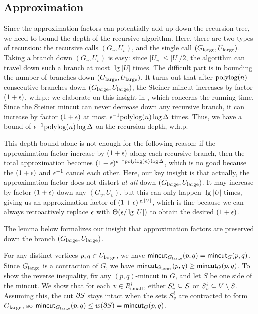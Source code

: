 
\subsection{Approximation}

Since the approximation factors can potentially add up down the recursion tree, we need to bound the depth of the recursive algorithm. Here, there are two types of recursion: the recursive calls $(G_v,U_v)$, and the single call $(G_{\textup{large}},U_{\textup{large}})$.  Taking a branch down $(G_v,U_v)$ is easy: since $|U_v|\le|U|/2$, the algorithm can travel down such a branch at most $\lg|U|$ times. The difficult part is in bounding the number of branches down $(G_{\textup{large}},U_{\textup{large}})$. It turns out that after $\textup{polylog}(n)$ consecutive branches down $(G_{\textup{large}},U_{\textup{large}})$, the Steiner mincut increases by factor $(1+\epsilon)$, w.h.p.; we elaborate on this insight in , which concerns the running time. Since the Steiner mincut can never decrease down any recursive branch, it can increase by factor $(1+\epsilon)$ at most $\epsilon^{-1}\textup{polylog}(n)\log\Delta$ times. Thus, we have a bound of $\epsilon^{-1}\textup{polylog}(n)\log\Delta$ on the recursion depth, w.h.p.

This depth bound alone is not enough for the following reason: if the approximation factor increase by $(1+\epsilon)$ along each recursive branch, then the total approximation becomes $(1+\epsilon)^{\epsilon^{-1}\textup{polylog}(n)\log\Delta}$, which is no good because the $(1+\epsilon)$ and $\epsilon^{-1}$ cancel each other. Here, our key insight is that actually, the approximation factor does not distort \emph{at all} down $(G_{\textup{large}},U_{\textup{large}})$. It may increase by factor $(1+\epsilon)$ down any $(G_v,U_v)$, but this can only happen $\lg|U|$ times, giving us an approximation factor of $(1+\epsilon)^{\lg|U|}$, which is fine because we can always retroactively replace $\epsilon$ with $\Theta(\epsilon/\lg|U|)$ to obtain the desired $(1+\epsilon)$.

The lemma below formalizes our insight that approximation factors are preserved down the branch $(G_{\textup{large}},U_{\textup{large}})$.

\BL{}
For any distinct vertices $p,q\in U_{\textup{large}}$, we have $\textsf{\textup{mincut}}_{G_{\textup{large}}}(p,q) = \textsf{\textup{mincut}}_G(p,q)$.
\EL
\BP
Since $G_{\textup{large}}$ is a contraction of $G$, we have $\textsf{\textup{mincut}}_{G_{\textup{large}}}(p,q) \ge \textsf{\textup{mincut}}_G(p,q)$. To show the reverse inequality, fix any $(p,q)$-mincut in $G$, and let $S$ be one side of the mincut. We show that for each $v\in  R^i_{\textup{small}}$, either $S^i_v\subseteq S$ or $S^i_v\subseteq V\setminus S$. Assuming this, the cut $\partial S$ stays intact when the sets $S^i_v$ are contracted to form $G_{\textup{large}}$, so $\textsf{\textup{mincut}}_{G_{\textup{large}}}(p,q) \le w(\partial S) = \textsf{\textup{mincut}}_G(p,q)$.

